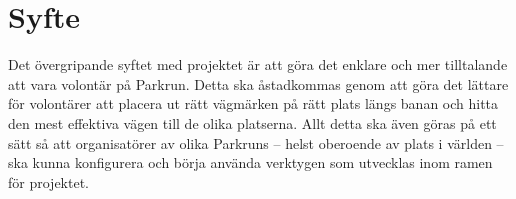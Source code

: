 \section{Syfte}
Det övergripande syftet med projektet är att göra det enklare och mer tilltalande att vara volontär på Parkrun.
Detta ska åstadkommas genom att göra det lättare för volontärer att placera ut rätt vägmärken på rätt plats längs banan och hitta den mest effektiva vägen till de olika platserna.
Allt detta ska även göras på ett sätt så att organisatörer av olika Parkruns -- helst oberoende av plats i världen -- ska kunna konfigurera och börja använda verktygen som utvecklas inom ramen för projektet.